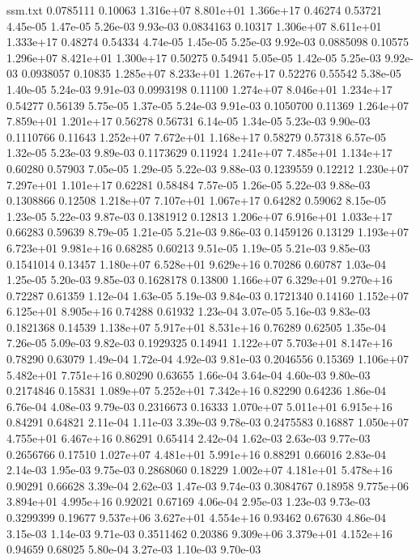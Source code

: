 \begin{filecontents}{ssm.txt}
0.0785111 0.10063 1.316e+07 8.801e+01 1.366e+17 0.46274 0.53721 4.45e-05 1.47e-05 5.26e-03 9.93e-03
0.0834163 0.10317 1.306e+07 8.611e+01 1.333e+17 0.48274 0.54334 4.74e-05 1.45e-05 5.25e-03 9.92e-03
0.0885098 0.10575 1.296e+07 8.421e+01 1.300e+17 0.50275 0.54941 5.05e-05 1.42e-05 5.25e-03 9.92e-03
0.0938057 0.10835 1.285e+07 8.233e+01 1.267e+17 0.52276 0.55542 5.38e-05 1.40e-05 5.24e-03 9.91e-03
0.0993198 0.11100 1.274e+07 8.046e+01 1.234e+17 0.54277 0.56139 5.75e-05 1.37e-05 5.24e-03 9.91e-03
0.1050700 0.11369 1.264e+07 7.859e+01 1.201e+17 0.56278 0.56731 6.14e-05 1.34e-05 5.23e-03 9.90e-03
0.1110766 0.11643 1.252e+07 7.672e+01 1.168e+17 0.58279 0.57318 6.57e-05 1.32e-05 5.23e-03 9.89e-03
0.1173629 0.11924 1.241e+07 7.485e+01 1.134e+17 0.60280 0.57903 7.05e-05 1.29e-05 5.22e-03 9.88e-03
0.1239559 0.12212 1.230e+07 7.297e+01 1.101e+17 0.62281 0.58484 7.57e-05 1.26e-05 5.22e-03 9.88e-03
0.1308866 0.12508 1.218e+07 7.107e+01 1.067e+17 0.64282 0.59062 8.15e-05 1.23e-05 5.22e-03 9.87e-03
0.1381912 0.12813 1.206e+07 6.916e+01 1.033e+17 0.66283 0.59639 8.79e-05 1.21e-05 5.21e-03 9.86e-03
0.1459126 0.13129 1.193e+07 6.723e+01 9.981e+16 0.68285 0.60213 9.51e-05 1.19e-05 5.21e-03 9.85e-03
0.1541014 0.13457 1.180e+07 6.528e+01 9.629e+16 0.70286 0.60787 1.03e-04 1.25e-05 5.20e-03 9.85e-03
0.1628178 0.13800 1.166e+07 6.329e+01 9.270e+16 0.72287 0.61359 1.12e-04 1.63e-05 5.19e-03 9.84e-03
0.1721340 0.14160 1.152e+07 6.125e+01 8.905e+16 0.74288 0.61932 1.23e-04 3.07e-05 5.16e-03 9.83e-03
0.1821368 0.14539 1.138e+07 5.917e+01 8.531e+16 0.76289 0.62505 1.35e-04 7.26e-05 5.09e-03 9.82e-03
0.1929325 0.14941 1.122e+07 5.703e+01 8.147e+16 0.78290 0.63079 1.49e-04 1.72e-04 4.92e-03 9.81e-03
0.2046556 0.15369 1.106e+07 5.482e+01 7.751e+16 0.80290 0.63655 1.66e-04 3.64e-04 4.60e-03 9.80e-03
0.2174846 0.15831 1.089e+07 5.252e+01 7.342e+16 0.82290 0.64236 1.86e-04 6.76e-04 4.08e-03 9.79e-03
0.2316673 0.16333 1.070e+07 5.011e+01 6.915e+16 0.84291 0.64821 2.11e-04 1.11e-03 3.39e-03 9.78e-03
0.2475583 0.16887 1.050e+07 4.755e+01 6.467e+16 0.86291 0.65414 2.42e-04 1.62e-03 2.63e-03 9.77e-03
0.2656766 0.17510 1.027e+07 4.481e+01 5.991e+16 0.88291 0.66016 2.83e-04 2.14e-03 1.95e-03 9.75e-03
0.2868060 0.18229 1.002e+07 4.181e+01 5.478e+16 0.90291 0.66628 3.39e-04 2.62e-03 1.47e-03 9.74e-03
0.3084767 0.18958 9.775e+06 3.894e+01 4.995e+16 0.92021 0.67169 4.06e-04 2.95e-03 1.23e-03 9.73e-03
0.3299399 0.19677 9.537e+06 3.627e+01 4.554e+16 0.93462 0.67630 4.86e-04 3.15e-03 1.14e-03 9.71e-03
0.3511462 0.20386 9.309e+06 3.379e+01 4.152e+16 0.94659 0.68025 5.80e-04 3.27e-03 1.10e-03 9.70e-03

\end{filecontents}
